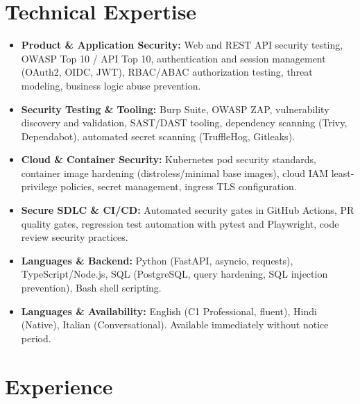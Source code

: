 \documentclass[10pt,a4paper]{article}
\begin{document}
\section{Technical Expertise}
\begin{itemize}
  \item \textbf{Product \& Application Security:} Web and REST API security testing, OWASP Top 10 / API Top 10, authentication and session management (OAuth2, OIDC, JWT), RBAC/ABAC authorization testing, threat modeling, business logic abuse prevention.
  \item \textbf{Security Testing \& Tooling:} Burp Suite, OWASP ZAP, vulnerability discovery and validation, SAST/DAST tooling, dependency scanning (Trivy, Dependabot), automated secret scanning (TruffleHog, Gitleaks).
  \item \textbf{Cloud \& Container Security:} Kubernetes pod security standards, container image hardening (distroless/minimal base images), cloud IAM least-privilege policies, secret management, ingress TLS configuration.
  \item \textbf{Secure SDLC \& CI/CD:} Automated security gates in GitHub Actions, PR quality gates, regression test automation with pytest and Playwright, code review security practices.
  \item \textbf{Languages \& Backend:} Python (FastAPI, asyncio, requests), TypeScript/Node.js, SQL (PostgreSQL, query hardening, SQL injection prevention), Bash shell scripting.
  \item \textbf{Languages \& Availability:} English (C1 Professional, fluent), Hindi (Native), Italian (Conversational). Available immediately without notice period.
\end{itemize}

\section{Experience}
\end{document}
